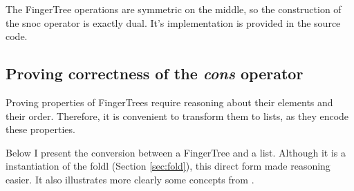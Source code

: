 \documentclass[12pt,twoside,notitlepage]{report}
\begin{document}
The FingerTree operations are symmetric on the middle, so the construction of the snoc operator is exactly dual. It's implementation is provided in the source code.

\subsection{Proving correctness of the \textit{cons} operator}

Proving properties of FingerTrees require reasoning about their elements and their order. Therefore, it is convenient to transform them to lists, as they encode these properties.

Below I present the conversion between a FingerTree and a list. Although it is a instantiation of the foldl (Section \ref{sec:fold}), this direct form made reasoning easier. It also illustrates more clearly some concepts from \cite{generalfold}.

\begin{code}
\\
\> \AgdaSymbol{:}  \AgdaSymbol{\{}\AgdaSymbol{\}\{} \AgdaSymbol{:}  \AgdaSymbol{\}\{} \AgdaSymbol{:}   \AgdaSymbol{\}}\<%
\\
\>[0]\<[10]%
\>[10]  \AgdaSymbol{:}   \<%
\\
\>[0]\<[10]%
\>[10]  \AgdaSymbol{:}     \AgdaSymbol{\{} \AgdaSymbol{:} \AgdaSymbol{\}}\<%
\\
\>[0]\<[10]%
\>[10]    \AgdaSymbol{\{}\AgdaSymbol{\}}\<%
\\
\>[0]\<[10]%
\>[10]  \<%
\\
\>  \AgdaSymbol{=} \AgdaInductiveConstructor{[]}\<%
\\
\> \AgdaSymbol{(} \AgdaSymbol{)} \AgdaSymbol{=}   \AgdaInductiveConstructor{[]}\<%
\\
\> \AgdaSymbol{(}   \AgdaSymbol{)} \AgdaSymbol{=} \AgdaSymbol{(} \AgdaSymbol{)} \AgdaFunction{++}\<%
\\
\>[10]\<[28]%
\>[28]\AgdaSymbol{(} \AgdaSymbol{(} \AgdaSymbol{))} \AgdaFunction{++}\<%
\\
\>[10]\<[28]%
\>[28]\AgdaSymbol{(} \AgdaSymbol{)}\<%
\\
\end{code}
\end{document}
